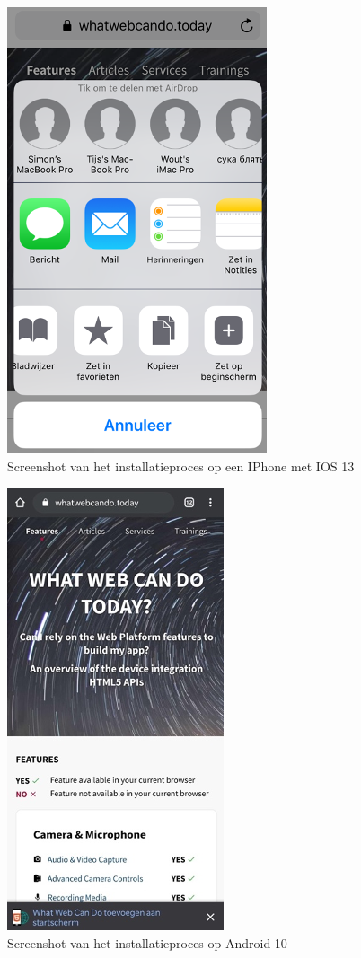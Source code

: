 \begin{figure}
	\centering
	\includegraphics{./img/installation_ios.png}
	\caption{Screenshot van het installatieproces op een IPhone met IOS 13}
\end{figure}

\begin{figure}
	\centering
	\includegraphics{./img/installation_android.png}
	\caption{Screenshot van het installatieproces op Android 10}
\end{figure}


